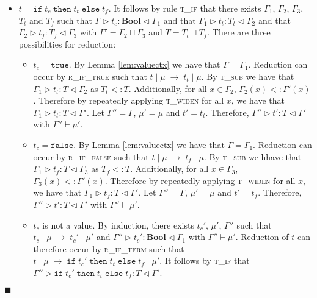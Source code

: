 \documentclass[preprint]{sigplanconf}
\newcommand{\lemref}[1]{Lemma \ref{#1}}
\newcommand{\rmethc}{\textsc{r\_meth\_call} }
\newcommand{\rifexpr}{\textsc{r\_if\_term} }
\newcommand{\riftrue}{\textsc{r\_if\_true} }
\newcommand{\riffalse}{\textsc{r\_if\_false} }
\newcommand{\tif}{\textsc{t\_if} }
\newcommand{\tsub}{\textsc{t\_sub} }
\newcommand{\twiden}{\textsc{t\_widen} }
\newcommand{\typerule}[4]{#1 \triangleright #2 : #3 \triangleleft #4}
\newcommand{\oprule}[4]{#1 \mid #2\;\longrightarrow\;#3 \mid #4}
\newcommand{\truev}{\mathtt{true}}
\newcommand{\falsev}{\mathtt{false}}
\newcommand{\boolt}{\mathbf{Bool}}
\newcommand{\ift}[3]{\mathtt{if} \; #1 \; \mathtt{then} \; #2 \; \mathtt{else} \; #3}
\newcommand{\qed}{$\blacksquare$}
\newenvironment{proof}{\vspace{1ex}\noindent{\bf Proof}\hspace{0.5em}}
  {\hfill\qed\vspace{1ex}}
\begin{document}
\begin{proof}
\begin{itemize}
Therefore reduction can occur by \rmethc such that
$x.m \mid \mu_1, x \mapsto o@S \longrightarrow v \mid \mu_1, x \mapsto o@S_n$.
Let $\mu' = \mu_1, x \mapsto o@S'$. Let $\Gamma'' = \Gamma'$. It follows that
$\Gamma'' \vdash \mu'$, as $O'@S_n <: O@\overline{S'}$. 
By application of the weakening lemma and rule \tsub, it follows that
$\typerule{\Gamma''}{v}{T}{\Gamma'}$.

\item $t = \ift{t_c}{t_t}{t_f}$. It follows by rule \tif that there exists
$\Gamma_1$, $\Gamma_2$, $\Gamma_3$, $T_t$ and $T_f$ such that
$\typerule{\Gamma}{t_c}{\boolt}{\Gamma_1}$ and that
$\typerule{\Gamma_1}{t_t}{T_t}{\Gamma_2}$ and that
$\typerule{\Gamma_2}{t_f}{T_f}{\Gamma_3}$ with
$\Gamma' = \Gamma_2 \sqcup \Gamma_3$ and $T = T_t \sqcup T_f$. There are
three possibilities for reduction:

  \begin{itemize}
  \item $t_c = \truev$. By \lemref{lem:valuectx} we have that
  $\Gamma = \Gamma_1$. Reduction can occur by \riftrue such that
  $\oprule{t}{\mu}{t_t}{\mu}$. By \tsub we have that
  $\typerule{\Gamma_1}{t_t}{T}{\Gamma_2}$ as $T_t <: T$. Additionally, for
  all $x \in \Gamma_2$, $\Gamma_2(x) <: \Gamma'(x)$. Therefore by
  repeatedly applying \twiden for all $x$, we have that
  $\typerule{\Gamma_1}{t_t}{T}{\Gamma'}$.
  Let $\Gamma'' = \Gamma$, $\mu' = \mu$ and 
  $t' = t_t$. Therefore, $\typerule{\Gamma''}{t'}{T}{\Gamma'}$ with
  $\Gamma'' \vdash \mu'$.

  \item $t_c = \falsev$. By \lemref{lem:valuectx} we have that
  $\Gamma = \Gamma_1$. Reduction can occur by \riffalse such that
  $\oprule{t}{\mu}{t_f}{\mu}$. By \tsub we hhave that
  $\typerule{\Gamma_1}{t_f}{T}{\Gamma_3}$ as $T_f <: T$. Additionally, for
  all $x \in \Gamma_3$, $\Gamma_3(x) <: \Gamma'(x)$. Therefore by
  repeatedly applying \twiden for all $x$, we have that
  $\typerule{\Gamma_1}{t_f}{T}{\Gamma'}$. Let $\Gamma'' = \Gamma$,
  $\mu' = \mu$ and $t' = t_f$. Therefore, 
  $\typerule{\Gamma''}{t'}{T}{\Gamma'}$ with $\Gamma'' \vdash \mu'$.

  \item $t_c$ is not a value. By induction, there exists $t_c'$,
  $\mu'$, $\Gamma''$ such that 
  $\oprule{t_c}{\mu}{t_c'}{\mu'}$ and 
  $\typerule{\Gamma''}{t_c'}{\boolt}{\Gamma_1}$ with $\Gamma'' \vdash \mu'$. 
  Reduction of $t$ can therefore occur by \rifexpr such that
  $\oprule{t}{\mu}{\ift{t_c'}{t_t}{t_f}}{\mu'}$. It follows
  by \tif that $\typerule{\Gamma''}{\ift{t_c'}{t_t}{t_f}}{T}{\Gamma'}$.
  \end{itemize}

\end{itemize}
\end{proof}
\end{document}
